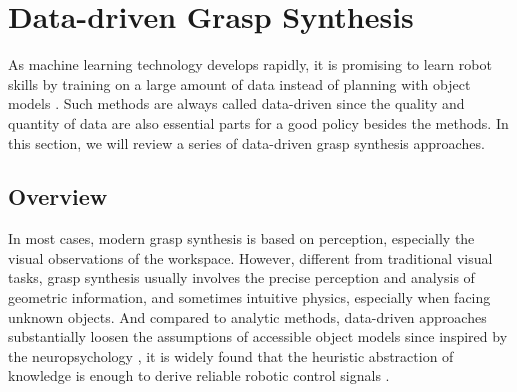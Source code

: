 \documentclass[letterpaper,10pt]{article}
\begin{document}
%

\section{Data-driven Grasp Synthesis}
\label{sec:data-driven-grasp}
As machine learning technology develops rapidly, it is promising to learn robot skills by training on a large amount of data instead of planning with object models \cite{bohg2013data, kroemer2021review}.
Such methods are always called data-driven since the quality and quantity of data are also essential parts for a good policy besides the methods.
In this section, we will review a series of data-driven grasp synthesis approaches.

\subsection{Overview}

In most cases, modern grasp synthesis is based on perception, especially the visual observations of the workspace.
However, different from traditional visual tasks, grasp synthesis usually involves the precise perception and analysis of geometric information, and sometimes intuitive physics, especially when facing unknown objects.
And compared to analytic methods, data-driven approaches substantially loosen the assumptions of accessible object models since inspired by the neuropsychology \cite{jeannerod1988neural}, it is widely found that the heuristic abstraction of knowledge is enough to derive reliable robotic control signals \cite{allen1985object, stansfield1987visually, iberall1988knowledge, liu1989multi, Nayar1994, salganicoff1996active, kamon1996learning, Piater2001}.
\end{document}
